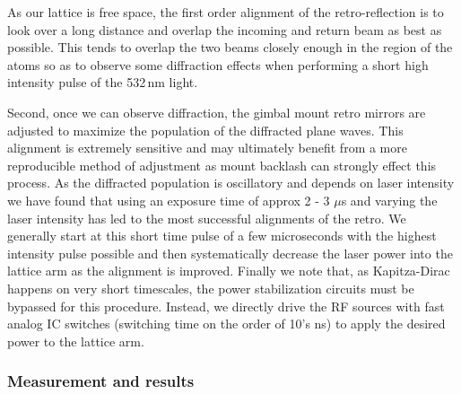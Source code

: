 As our lattice is free space, the first order alignment of the retro-reflection is to look over a long distance and overlap the incoming and return beam as best as possible.
This tends to overlap the two beams closely enough in the region of the atoms so as to observe some diffraction effects when performing a short high intensity pulse of the 532\,nm light.

Second, once we can observe diffraction, the gimbal mount retro mirrors are adjusted to maximize the population of the diffracted plane waves.
This alignment is extremely sensitive and may ultimately benefit from a more reproducible method of adjustment as mount backlash can strongly effect this process.
As the diffracted population is oscillatory and depends on laser intensity we have found that using an exposure time of approx 2 - 3 $\mu$s and varying the laser intensity has led to the most successful alignments of the retro.
We generally start at this short time pulse of a few microseconds with the highest intensity pulse possible and then systematically decrease the laser power into the lattice arm as the alignment is improved.
Finally we note that, as Kapitza-Dirac happens on very short timescales, the power stabilization circuits must be bypassed for this procedure.
Instead, we directly drive the RF sources with fast analog IC switches (switching time on the order of 10's ns) to apply the desired power to the lattice arm.

\subsubsection{Measurement and results}
